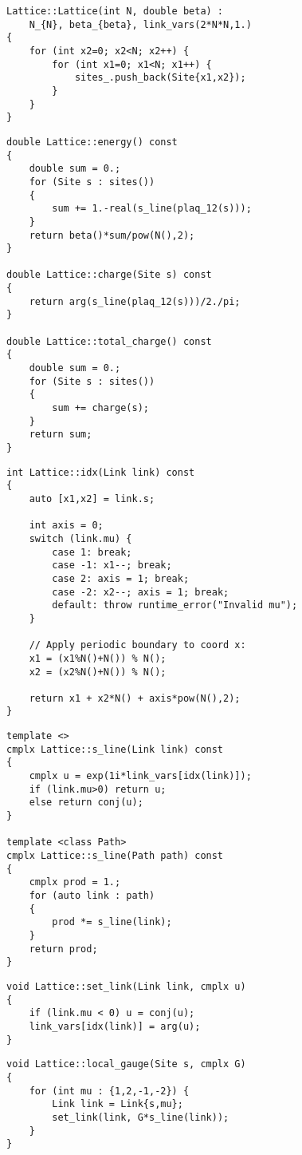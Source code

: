 \begin{lstlisting}[caption={Lattice constructor}]
Lattice::Lattice(int N, double beta) :
    N_{N}, beta_{beta}, link_vars(2*N*N,1.)
{
    for (int x2=0; x2<N; x2++) {
        for (int x1=0; x1<N; x1++) {
            sites_.push_back(Site{x1,x2});
        }
    }
}
\end{lstlisting}

\begin{lstlisting}[caption={Lattice observables}]
double Lattice::energy() const
{
    double sum = 0.;
    for (Site s : sites())
    {
        sum += 1.-real(s_line(plaq_12(s)));
    }
    return beta()*sum/pow(N(),2);
}

double Lattice::charge(Site s) const
{
    return arg(s_line(plaq_12(s)))/2./pi;
}

double Lattice::total_charge() const
{
    double sum = 0.;
    for (Site s : sites())
    {
        sum += charge(s);
    }
    return sum;
}
\end{lstlisting}

\begin{lstlisting}[caption={Link indexing}]
int Lattice::idx(Link link) const
{
    auto [x1,x2] = link.s;
    
    int axis = 0;
    switch (link.mu) {
        case 1: break;
        case -1: x1--; break;
        case 2: axis = 1; break;
        case -2: x2--; axis = 1; break;
        default: throw runtime_error("Invalid mu");
    }

    // Apply periodic boundary to coord x:
    x1 = (x1%N()+N()) % N();
    x2 = (x2%N()+N()) % N();
    
    return x1 + x2*N() + axis*pow(N(),2);
}
\end{lstlisting}

\begin{lstlisting}[caption={Schwinger lines}]
template <>
cmplx Lattice::s_line(Link link) const
{
    cmplx u = exp(1i*link_vars[idx(link)]);
    if (link.mu>0) return u;
    else return conj(u);
}

template <class Path>
cmplx Lattice::s_line(Path path) const
{
    cmplx prod = 1.;
    for (auto link : path)
    {
        prod *= s_line(link);
    }
    return prod;
}
\end{lstlisting}

\begin{lstlisting}[caption={Link updating}]
void Lattice::set_link(Link link, cmplx u)
{
    if (link.mu < 0) u = conj(u);
    link_vars[idx(link)] = arg(u);
}
\end{lstlisting}

\begin{lstlisting}[caption={Local gauge transform}]
void Lattice::local_gauge(Site s, cmplx G)
{
    for (int mu : {1,2,-1,-2}) {
        Link link = Link{s,mu};
        set_link(link, G*s_line(link));
    }
}
\end{lstlisting}



